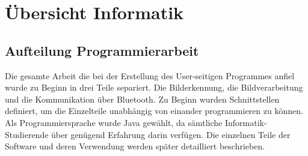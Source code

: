 \section{Übersicht Informatik}
\subsection{Aufteilung Programmierarbeit}
Die gesamte Arbeit die bei der Erstellung des User-seitigen Programmes anfiel wurde zu Beginn in drei Teile separiert. Die Bilderkennung, die Bildverarbeitung und die Kommunikation über Bluetooth. Zu Beginn wurden Schnittstellen definiert, um die Einzelteile unabhängig von einander programmieren zu können. Als Programmiersprache wurde Java gewählt, da sämtliche Informatik-Studierende über genügend Erfahrung darin verfügen. Die einzelnen Teile der Software und deren Verwendung werden später detailliert beschrieben.